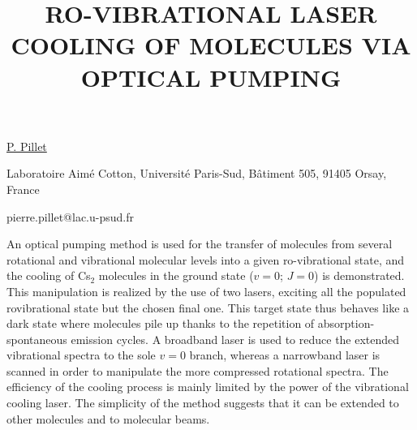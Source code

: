\title{RO-VIBRATIONAL LASER COOLING OF MOLECULES VIA OPTICAL PUMPING}

\underline{P. Pillet} 

{\normalsize{\vspace{-4mm}
Laboratoire Aim\'e Cotton, Universit\'e Paris-Sud, B\^atiment 505, 91405 Orsay, France

\email pierre.pillet@lac.u-psud.fr}}

An optical pumping method is used for the transfer of molecules from several rotational and vibrational molecular levels into a given
ro-vibrational state, and the cooling of Cs$_2$ molecules in the ground state ($v = 0$; $J = 0$) is demonstrated. This manipulation is
realized by the use of two lasers, exciting all the populated rovibrational state but the chosen final one. This target state thus
behaves like a dark state where molecules pile up thanks to the repetition of absorption-spontaneous emission cycles. A broadband
laser is used to reduce the extended vibrational spectra to the sole $v = 0$ branch, whereas a narrowband laser is scanned in order to
manipulate the more compressed rotational spectra. The efficiency of the cooling process is mainly limited by the power of the
vibrational cooling laser. The simplicity of the method suggests that it can be extended to other molecules and to molecular beams.

\vspace{\baselineskip} 